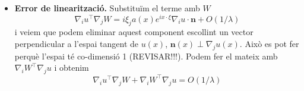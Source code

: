 \begin{itemize}

    \item \textbf{Error de linearització.} Substituïm el terme amb $W$
    \begin{equation*}
         \nabla_i u ^{\intercal}\nabla_j W = i\xi_j a(x)e^{ix\cdot\xi}\nabla_i u\cdot\textbf{n}+O(1/\lambda)
    \end{equation*}
    i veiem que podem eliminar aquest component escollint un vector perpendicular a l'espai tangent de $u(x)$, $\textbf{n}(x)\perp \nabla_j u(x)$. Això es pot fer perquè l'espai té co-dimensió 1 ({\color{blue}REVISAR!!!}). Podem fer el mateix amb $\nabla_iW^{\intercal}\nabla_ju$ i obtenim
    \begin{equation*}
        \nabla_i u ^{\intercal}\nabla_j W + \nabla_iW^{\intercal}\nabla_ju = O(1/\lambda)
    \end{equation*}


\end{itemize}
